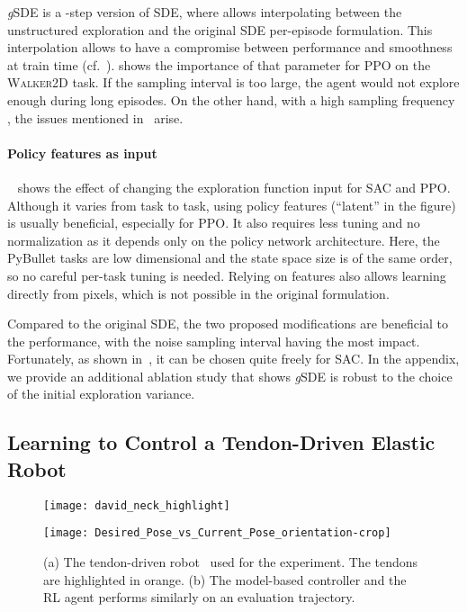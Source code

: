 \documentclass{article}
\newcommand{\cf}{cf.}
\newcommand{\SDE}{\textsc{SDE}\xspace}
\newcommand{\ourSDE}{\textit{g}\textsc{SDE}\xspace}
\newcommand{\ppo}{\textsc{PPO}\xspace}
\newcommand{\sac}{\textsc{SAC}\xspace}
\newcommand{\walker}{\textsc{Walker2D}\xspace}
\begin{document}
\ourSDE is a -step version of \SDE, where  allows interpolating between the unstructured exploration  and the original \SDE per-episode formulation.
This interpolation allows to have a compromise between performance and smoothness at train time (\cf\ ).
 shows the importance of that parameter for \ppo on the \walker task.
If the sampling interval is too large, the agent would not explore enough during long episodes.
On the other hand, with a high sampling frequency , the issues mentioned in~ arise.

\paragraph{Policy features as input}
~ shows the effect of changing the exploration function input for \sac and \ppo. Although it varies from task to task, using policy features (``latent'' in the figure) is usually beneficial, especially for \ppo. It also requires less tuning and no normalization as it depends only on the policy network architecture. Here, the PyBullet tasks are low dimensional and the state space size is of the same order, so no careful per-task tuning is needed. Relying on features also allows learning directly from pixels, which is not possible in the original formulation.


Compared to the original \SDE, the two proposed modifications are beneficial to the performance, with the noise sampling interval  having the most impact.
Fortunately, as shown in~, it can be chosen quite freely for \sac.
In the appendix, we provide an additional ablation study that shows \ourSDE is robust to the choice of the initial exploration variance.


\subsection{Learning to Control a Tendon-Driven Elastic Robot}
\label{sec:exp-real}
\begin{figure}[h]
  \begin{minipage}[t]{.5\linewidth}
    \centering\texttt{[image: david\_neck\_highlight]}
    \label{fig:david-neck}
  \end{minipage}
  \begin{minipage}[t]{.5\linewidth}
    \centering\texttt{[image: Desired\_Pose\_vs\_Current\_Pose\_orientation-crop]}
    \label{fig:eval-traj}
  \end{minipage}
  \caption{(a) The tendon-driven robot~\citep{reinecke2016structurally} used for the experiment. The tendons are highlighted in orange. (b) The model-based controller and the RL agent performs similarly on an evaluation trajectory.}
\end{figure}
\end{document}
